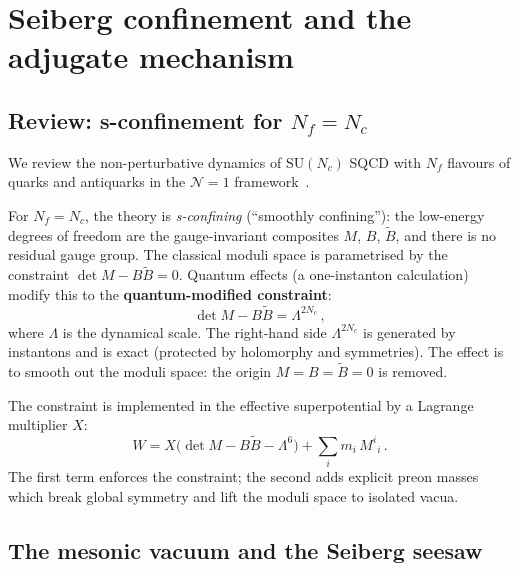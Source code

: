 \documentclass[12pt,a4paper]{article}
\newcommand{\SU}{\mathrm{SU}}
\newcommand{\Nf}{N_{\!f}}
\newcommand{\Nc}{N_{\!c}}
\begin{document}
\section{Seiberg confinement and the adjugate mechanism}
\label{sec:seiberg}

\subsection{Review: s-confinement for $\Nf = \Nc$}

We review the non-perturbative dynamics of $\SU(\Nc)$ SQCD with
$\Nf$ flavours of quarks and antiquarks in the $\mathcal{N}{=}1$
framework~\cite{Seiberg:1994bz,Tong:SUSY}.

For $\Nf = \Nc$, the theory is \emph{s-confining} (``smoothly
confining''): the low-energy degrees of freedom are the
gauge-invariant composites $M$, $B$, $\tilde{B}$, and there is
no residual gauge group.
The classical moduli space is parametrised by the constraint
$\det M - B\tilde{B} = 0$.
Quantum effects (a one-instanton calculation) modify this to the
\textbf{quantum-modified constraint}:
\begin{equation}
  \det M - B\tilde{B} = \Lambda^{2\Nc}\,,
  \label{eq:constraint}
\end{equation}
where $\Lambda$ is the dynamical scale.
The right-hand side $\Lambda^{2\Nc}$ is generated by instantons
and is exact (protected by holomorphy and symmetries).
The effect is to smooth out the moduli space: the origin
$M = B = \tilde{B} = 0$ is removed.

The constraint is implemented in the effective superpotential by
a Lagrange multiplier $X$:
\begin{equation}
  W = X\bigl(\det M - B\tilde{B} - \Lambda^6\bigr)
    + \sum_i m_i\,M^i{}_i\,.
  \label{eq:Wtot}
\end{equation}
The first term enforces the constraint; the second adds explicit
preon masses which break global symmetry and lift the moduli
space to isolated vacua.


\subsection{The mesonic vacuum and the Seiberg seesaw}
\end{document}
